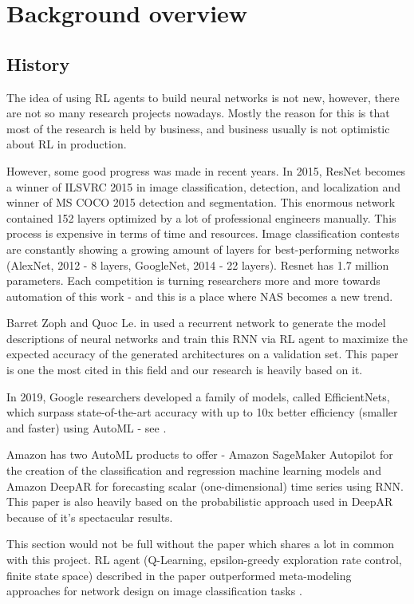 \chapter{Background overview}

\section{History}

The idea of using RL agents to build neural networks is not new, however, there are not so many research projects nowadays. Mostly the reason for this is that most of the research is held by business, and business usually is not optimistic about RL in production.

However, some good progress was made in recent years. In 2015, ResNet becomes a winner of ILSVRC 2015 in image classification, detection, and localization and winner of MS COCO 2015 detection and segmentation. This enormous network contained 152 layers optimized by a lot of professional engineers manually. This process is expensive in terms of time and resources. Image classification contests are constantly showing a growing amount of layers for best-performing networks (AlexNet, 2012 - 8 layers, GoogleNet, 2014 - 22 layers). Resnet has 1.7 million parameters. Each competition is turning researchers more and more towards automation of this work - and this is a place where NAS becomes a new trend.

Barret Zoph and Quoc Le. in \cite{ZophL16} used a recurrent network to generate the model descriptions of neural networks and train this RNN via RL agent to maximize the expected accuracy of the generated architectures on a validation set. This paper is one the most cited in this field and our research is heavily based on it.

In 2019, Google researchers developed a family of models, called EfficientNets, which surpass state-of-the-art accuracy with up to 10x better efficiency (smaller and faster) using AutoML - see \cite{2019arXiv190511946T}.

Amazon has two AutoML products to offer - Amazon SageMaker Autopilot for the creation of the classification and regression machine learning models and Amazon DeepAR for forecasting scalar (one-dimensional) time series using RNN. This paper is also heavily based on the probabilistic approach used in DeepAR because of it’s spectacular results.

This section would not be full without the paper which shares a lot in common with this project. RL agent (Q-Learning, epsilon-greedy exploration rate control, finite state space) described in the paper outperformed meta-modeling approaches for network design on image classification tasks \cite{Baker2016DesigningNN}.

